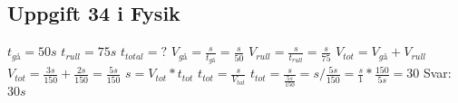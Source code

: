 \documentclass[a4paper,11pt]{article}
\begin{document}
\begin{flushleft}
\subsection{Uppgift 34 i Fysik}
$ t_{gå}=50s $\newline
$ t_{rull}=75s $\newline
$ t_{total}=?$\newline
$ V_{gå}=\frac{s}{t_{gå}}=\frac{s}{50} $\newline
$ V_{rull}=\frac{s}{t_{rull}}=\frac{s}{75} $\newline
$ V_{tot}=V_{gå}+V_{rull} $\newline
$ V_{tot}=\frac{3s}{150}+\frac{2s}{150}=\frac{5s}{150} $\newline
$ s=V_{tot}*t_{tot} $\newline
$ t_{tot}=\frac{s}{V_{tot}} $\newline
$ t_{tot}=\frac{s}{\frac{5s}{150}}=s/\frac{5s}{150}=\frac{s}{1}*\frac{150}{5s}=30 $\newline
Svar: $30s$
\end{flushleft}
\end{document}
